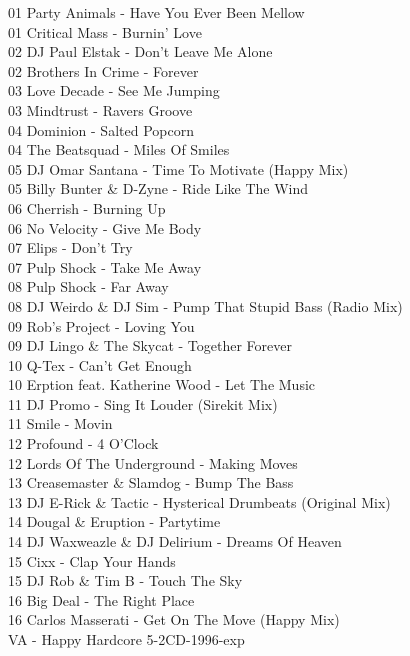 \begin{multicols}{2}
 01 Party Animals - Have You Ever Been Mellow\\ 01 Critical Mass - Burnin' Love\\ 02 DJ Paul Elstak - Don't Leave Me Alone\\ 02 Brothers In Crime - Forever\\ 03 Love Decade - See Me Jumping\\ 03 Mindtrust - Ravers Groove\\ 04 Dominion - Salted Popcorn\\ 04 The Beatsquad - Miles Of Smiles\\ 05 DJ Omar Santana - Time To Motivate (Happy Mix)\\ 05 Billy Bunter \& D-Zyne - Ride Like The Wind\\ 06 Cherrish - Burning Up\\ 06 No Velocity - Give Me Body\\ 07 Elips - Don't Try\\ 07 Pulp Shock - Take Me Away\\ 08 Pulp Shock - Far Away\\ 08 DJ Weirdo \& DJ Sim - Pump That Stupid Bass (Radio Mix)\\ 09 Rob's Project - Loving You\\ 09 DJ Lingo \& The Skycat - Together Forever\\ 10 Q-Tex - Can't Get Enough\\ 10 Erption feat. Katherine Wood - Let The Music\\ 11 DJ Promo - Sing It Louder (Sirekit Mix)\\ 11 Smile - Movin\\ 12 Profound - 4 O'Clock\\ 12 Lords Of The Underground - Making Moves\\ 13 Creasemaster \& Slamdog - Bump The Bass\\ 13 DJ E-Rick \& Tactic - Hysterical Drumbeats (Original Mix)\\ 14 Dougal \& Eruption - Partytime\\ 14 DJ Waxweazle \& DJ Delirium - Dreams Of Heaven\\ 15 Cixx - Clap Your Hands\\ 15 DJ Rob \& Tim B - Touch The Sky\\ 16 Big Deal - The Right Place\\ 16 Carlos Masserati - Get On The Move (Happy Mix)\\
 \large VA - Happy Hardcore 5-2CD-1996-exp \normalsize\\

\end{multicols}
